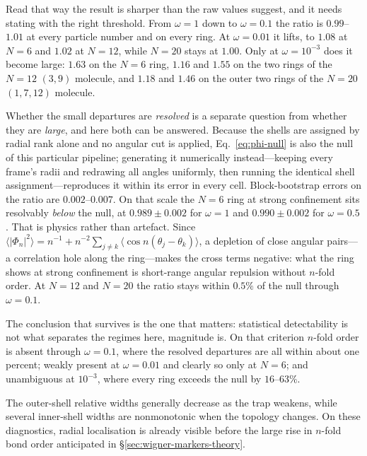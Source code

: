 Read that way the result is sharper than the raw values suggest, and it needs stating with
the right threshold. From $\omega=1$ down to $\omega=0.1$ the ratio is $0.99$--$1.01$ at
every particle number and on every ring. At $\omega=0.01$ it lifts, to $1.08$ at $N{=}6$ and
$1.02$ at $N{=}12$, while $N{=}20$ stays at $1.00$. Only at $\omega=10^{-3}$ does it become
large: $1.63$ on the $N{=}6$ ring, $1.16$ and $1.55$ on the two rings of the $N{=}12$ $(3,9)$
molecule, and $1.18$ and $1.46$ on the outer two rings of the $N{=}20$ $(1,7,12)$ molecule.

Whether the small departures are \emph{resolved} is a separate question from whether they
are \emph{large}, and here both can be answered. Because the shells are assigned by radial
rank alone and no angular cut is applied, Eq.~\eqref{eq:phi-null} is also the null of this
particular pipeline; generating it numerically instead---keeping every frame's radii and
redrawing all angles uniformly, then running the identical shell assignment---reproduces it
within its error in every cell. Block-bootstrap errors on the ratio are $0.002$--$0.007$. On
that scale the $N{=}6$ ring at strong confinement sits resolvably \emph{below} the null, at
$0.989\pm0.002$ for $\omega=1$ and $0.990\pm0.002$ for $\omega=0.5$. That is physics rather
than artefact. Since
$\langle|\Phi_n|^2\rangle=n^{-1}+n^{-2}\sum_{j\neq k}\langle\cos n(\theta_j-\theta_k)\rangle$,
a depletion of close angular pairs---a correlation hole along the ring---makes the cross
terms negative: what the ring shows at strong confinement is short-range angular repulsion
without $n$-fold order. At $N{=}12$ and $N{=}20$ the ratio stays within $0.5\%$ of the null
through $\omega=0.1$.

The conclusion that survives is the one that matters: statistical detectability is not what
separates the regimes here, magnitude is. On that criterion $n$-fold order is absent through
$\omega=0.1$, where the resolved departures are all within about one percent; weakly present at
$\omega=0.01$ and clearly so only at $N{=}6$; and unambiguous at $10^{-3}$, where every ring
exceeds the null by $16$--$63\%$.

The outer-shell relative widths generally decrease as the trap weakens, while several
inner-shell widths are nonmonotonic when the topology changes. On these diagnostics, radial
localisation is already visible before the large rise in $n$-fold bond order anticipated in
\S\ref{sec:wigner-markers-theory}.

